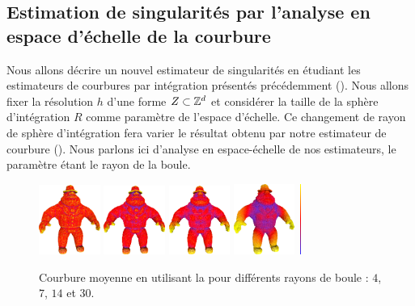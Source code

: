 \subsection{Estimation de singularités par l'analyse en espace d'échelle de la
courbure}%
\label{sec:applications:feature:II}
%
Nous allons décrire un nouvel estimateur de singularités \cite{SMI2015} en
étudiant les estimateurs de courbures par intégration présentés précédemment
(). Nous allons fixer la résolution $h$ d'une
forme $Z \subset \mathbb{Z}^d$ et considérer la taille de la sphère
d'intégration $R$ comme paramètre de l'espace d'échelle. Ce changement de rayon
de sphère d'intégration fera varier le résultat obtenu par notre estimateur de
courbure (). Nous parlons ici d'analyse en
espace-échelle de nos estimateurs, le paramètre étant le rayon de la boule.
%
\begin{figure}[ht]{
    \begin{center}
      \includegraphics[width=2cm]{images/Curvature/MeanAl_4}
      \includegraphics[width=2cm]{images/Curvature/MeanAl_7}
      \includegraphics[width=2cm]{images/Curvature/MeanAl_14}
      \includegraphics[width=2cm]{images/Curvature/MeanAl_30}
      \includegraphics[width=0.1cm,height=2.3cm]{images/YMTB6W}
    \end{center}}
    \caption{Courbure moyenne en utilisant la 
      pour différents rayons de boule : $4$, $7$, $14$ et $30$.
      \label{fig:curvature-scale-3d}}
\end{figure}
